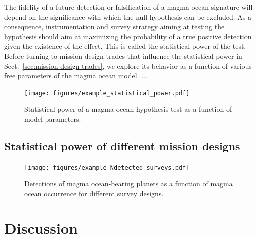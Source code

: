 \documentclass[modern]{aastex631}
\begin{document}
\begin{note}
   The fidelity of a future detection or falsification of a magma ocean signature will depend on the significance with which the null hypothesis can be excluded.
   As a consequence, instrumentation and survey strategy aiming at testing the hypothesis should aim at maximizing the probability of a true positive detection given the existence of the effect.
   This is called the statistical power of the test.
   Before turning to mission design trades that influence the statistical power in Sect.~\ref{sec:mission-design-trades}, we explore its behavior as a function of various free parameters of the magma ocean model.
    ...
\begin{figure}[ht!]
    \begin{centering}
        \texttt{[image: figures/example\_statistical\_power.pdf]}
        \caption{
        Statistical power of a magma ocean hypothesis test as a function of model parameters.
        }
        \label{fig:statistical_power}
    \end{centering}
\end{figure}

\end{note}

\subsection{Statistical power of different mission designs}\label{sec:statpower_missions}

\begin{figure}[ht!]
    \begin{centering}

        \texttt{[image: figures/example\_Ndetected\_surveys.pdf]}
        \caption{
        Detections of magma ocean-bearing planets as a function of magma ocean occurrence for different survey designs.
        }
        \label{fig:example_Ndetected_surveys}
    \end{centering}
\end{figure}

\section{Discussion}\label{sec:discussion}
\end{document}
